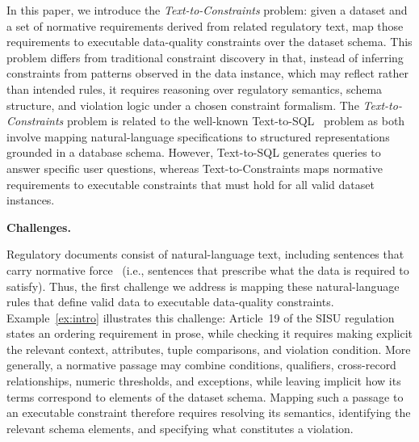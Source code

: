 In this paper, we introduce the \emph{Text-to-Constraints} problem: given a dataset and a set of normative requirements derived from related regulatory text, map those requirements to executable data-quality constraints over the dataset schema.  This problem differs from traditional constraint discovery in that, instead of inferring constraints from patterns observed in the data instance, which may reflect  rather than intended rules, it requires reasoning over regulatory semantics, schema structure, and violation logic under a chosen constraint formalism. The \emph{Text-to-Constraints} problem is related to the well-known Text-to-SQL~\cite{llmTEXT2SQLSurvey2025} problem as both involve mapping natural-language specifications to structured representations grounded in a database schema. However, Text-to-SQL generates queries to answer specific user questions,  whereas Text-to-Constraints maps normative requirements to executable constraints that must hold for all valid dataset instances.  %

\smallskip
\noindent\textbf{Challenges.}

Regulatory documents consist of natural-language text, including sentences that carry normative force~\cite{https://doi.org/10.1111/jels.12364} (i.e., sentences that prescribe what the data is required to satisfy). Thus, the first challenge we address is mapping these natural-language rules that define valid data to executable data-quality constraints. Example~\ref{ex:intro} illustrates this challenge: Article~19 of the SISU regulation states an ordering requirement in prose, while checking it requires making explicit the relevant context, attributes, tuple comparisons, and violation condition. More generally, a normative passage may combine conditions, qualifiers, cross-record relationships, numeric thresholds, and exceptions, while leaving implicit how its terms correspond to elements of the dataset schema. Mapping such a passage to an executable constraint therefore requires resolving its semantics, identifying the relevant schema elements, and specifying what constitutes a violation.



